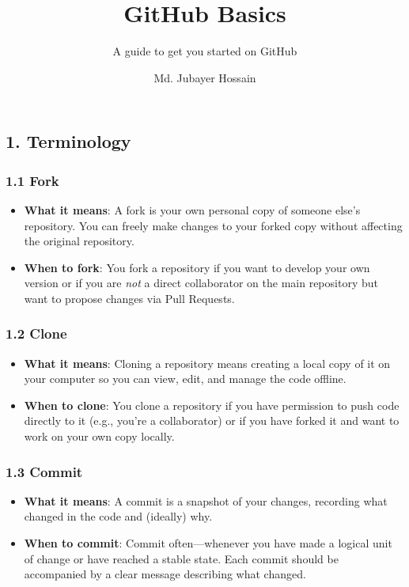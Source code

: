 \documentclass[
  letterpaper,
  DIV=11,
  numbers=noendperiod]{scrartcl}
\title{GitHub Basics}
\subtitle{A guide to get you started on GitHub}
\author{Md. Jubayer Hossain}
\date{}
\makeatletter
\providecommand{\tightlist}{%
  \setlength{\itemsep}{0pt}\setlength{\parskip}{0pt}}\usepackage{longtable,booktabs,array}
\renewcommand{\maketitle}{\bgroup\setlength{\parindent}{0pt}
\begin{flushleft}
  {\sffamily\huge\textbf{\MakeUppercase{\@title}}} \vspace{0.3cm} \newline
  {\Large {\@subtitle}} \newline
  \@author
\end{flushleft}\egroup
}
\makeatother
\begin{document}
\maketitle

\pagestyle{mystyle}


\subsection{1. Terminology}\label{terminology}

\subsubsection{1.1 Fork}\label{fork}

\begin{itemize}
\tightlist
\item
  \textbf{What it means}: A fork is your own personal copy of someone
  else's repository. You can freely make changes to your forked copy
  without affecting the original repository.
\item
  \textbf{When to fork}: You fork a repository if you want to develop
  your own version or if you are \emph{not} a direct collaborator on the
  main repository but want to propose changes via Pull Requests.
\end{itemize}

\subsubsection{1.2 Clone}\label{clone}

\begin{itemize}
\tightlist
\item
  \textbf{What it means}: Cloning a repository means creating a local
  copy of it on your computer so you can view, edit, and manage the code
  offline.
\item
  \textbf{When to clone}: You clone a repository if you have permission
  to push code directly to it (e.g., you're a collaborator) or if you
  have forked it and want to work on your own copy locally.
\end{itemize}

\subsubsection{1.3 Commit}\label{commit}

\begin{itemize}
\tightlist
\item
  \textbf{What it means}: A commit is a snapshot of your changes,
  recording what changed in the code and (ideally) why.
\item
  \textbf{When to commit}: Commit often---whenever you have made a
  logical unit of change or have reached a stable state. Each commit
  should be accompanied by a clear message describing what changed.
\end{itemize}
\end{document}
